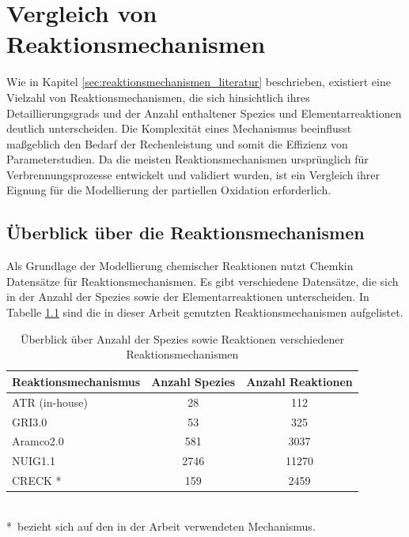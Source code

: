 \chapter{Vergleich von Reaktionsmechanismen}
    Wie in Kapitel \ref{sec:reaktionsmechanismen_literatur} beschrieben, existiert eine Vielzahl von Reaktionsmechanismen, die sich hinsichtlich ihres Detaillierungsgrads und der Anzahl enthaltener Spezies und Elementarreaktionen deutlich unterscheiden. Die Komplexität eines Mechanismus beeinflusst maßgeblich den Bedarf der Rechenleistung und somit die Effizienz von Parameterstudien. 
    Da die meisten Reaktionsmechanismen ursprünglich für Verbrennungsprozesse entwickelt und validiert wurden, ist ein Vergleich ihrer Eignung für die Modellierung der partiellen Oxidation erforderlich. 
    \section{Überblick über die Reaktionsmechanismen}
    Als Grundlage der Modellierung chemischer Reaktionen nutzt Chemkin Datensätze für Reaktionsmechanismen. Es gibt verschiedene Datensätze, die sich in der Anzahl der Spezies sowie der Elementarreaktionen unterscheiden. In Tabelle \ref{tab:reaktionsmechanismen_überblick} sind die in dieser Arbeit genutzten Reaktionsmechanismen aufgelistet. 
    \begin{table}[H]
        \centering
        \caption{Überblick über Anzahl der Spezies sowie Reaktionen verschiedener Reaktionsmechanismen}
        \begin{tabular}{lcc}
        \toprule
        \textbf{Reaktionsmechanismus} & \textbf{Anzahl Spezies} & \textbf{Anzahl Reaktionen} \\
        \midrule
        ATR (in-house) & 28 & 112 \\
        GRI3.0         & 53 & 325 \\
        Aramco2.0      & 581 & 3037 \\
        NUIG1.1        & 2746 & 11270 \\
        CRECK *          & 159 & 2459 \\
        \bottomrule
        \end{tabular}
        \footnotesize{\\ *~bezieht sich auf den in der Arbeit verwendeten Mechanismus.}
        \label{tab:reaktionsmechanismen_überblick}
        
    \end{table}
